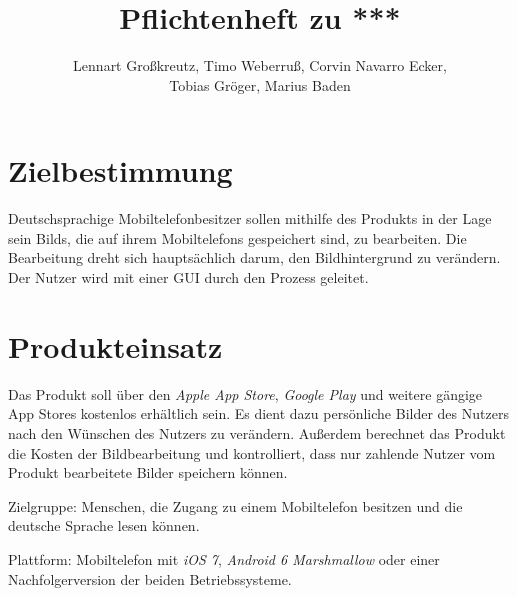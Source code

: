 \documentclass[parskip=full]{scrartcl}
\title{Pflichtenheft zu ***}
\author{Lennart Großkreutz, Timo Weberruß, Corvin Navarro Ecker, \\ Tobias Gröger, Marius Baden}
\begin{document}
\begin{titlepage} 
\maketitle
\end{titlepage}
\newpage
\tableofcontents
\newpage

%
%
\section{Zielbestimmung}
Deutschsprachige Mobiltelefonbesitzer sollen mithilfe des Produkts in der Lage sein \glspl{Bild}, die auf ihrem \glspl{Mobiltelefon} gespeichert sind, zu bearbeiten. Die Bearbeitung dreht sich hauptsächlich darum, den Bildhintergrund zu verändern. Der \gls{Nutzer} wird mit einer \gls{GUI} durch den Prozess geleitet.

\section{Produkteinsatz}
Das Produkt soll über den \textit{Apple App Store}, \textit{Google Play} und weitere gängige App Stores kostenlos erhältlich sein. Es dient dazu persönliche Bilder des \gls{Nutzer}s nach den Wünschen des Nutzers zu verändern. Außerdem berechnet das Produkt die Kosten der Bildbearbeitung und kontrolliert, dass nur zahlende Nutzer vom Produkt bearbeitete Bilder speichern können. 

Zielgruppe: Menschen, die Zugang zu einem Mobiltelefon besitzen und die deutsche Sprache lesen können.

Plattform: Mobiltelefon mit \textit{iOS 7}, \textit{Android 6 Marshmallow} oder einer Nachfolgerversion der beiden Betriebssysteme.
\end{document}

